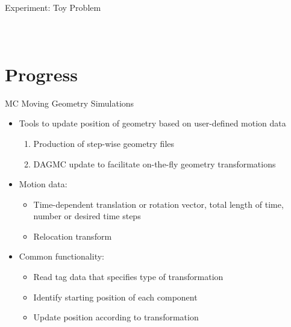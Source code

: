 \documentclass{beamer}
\begin{document}
\begin{frame}{Experiment: Toy Problem}
\begin{columns}
\begin{figure}
{\begin{tikzpicture}[every text node part/.style={align=center}]
	\end{tikzpicture}
        }
\end{figure}
\end{columns}
\end{frame}


\section{Progress}
\begin{frame}{MC Moving Geometry Simulations}
	\begin{itemize}
		\item{Tools to update position of geometry based on
			user-defined motion data}
			\begin{enumerate}
				\item{Production of step-wise geometry files}
				\item{DAGMC update to facilitate on-the-fly
					geometry transformations} 
			\end{enumerate}
		\item{Motion data:}
			\begin{itemize}
				\item{Time-dependent translation or rotation
					vector, total length of time, number or desired time steps}
				\item{Relocation transform}
			\end{itemize}
		\item{Common functionality:}
			\begin{itemize}
				\item{Read tag data that specifies type of
					transformation}
				\item{Identify starting position of each
					component}
				\item{Update position according to
					transformation}
			\end{itemize}
	\end{itemize}
\end{frame}
\end{document}
